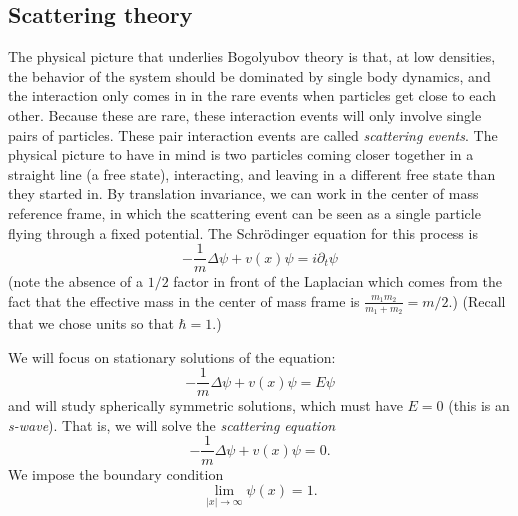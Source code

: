 \documentclass{ian}
\begin{document}
\subsection{Scattering theory}
\indent
The physical picture that underlies Bogolyubov theory is that, at low densities, the behavior of the system should be dominated by single body dynamics, and the interaction only comes in in the rare events when particles get close to each other.
Because these are rare, these interaction events will only involve single pairs of particles.
These pair interaction events are called {\it scattering events}.
The physical picture to have in mind is two particles coming closer together in a straight line (a free state), interacting, and leaving in a different free state than they started in.
By translation invariance, we can work in the center of mass reference frame, in which the scattering event can be seen as a single particle flying through a fixed potential.
The Schr\"odinger equation for this process is
\begin{equation}
  -\frac1m\Delta\psi+v(x)\psi=i\partial_t\psi
\end{equation}
(note the absence of a $1/2$ factor in front of the Laplacian which comes from the fact that the effective mass in the center of mass frame is $\frac{m_1m_2}{m_1+m_2}=m/2$.)
(Recall that we chose units so that $\hbar=1$.)
\bigskip

\indent
We will focus on stationary solutions of the equation:
\begin{equation}
  -\frac1m\Delta\psi+v(x)\psi=E\psi
\end{equation}
and will study spherically symmetric solutions, which must have $E=0$ (this is an {\it s-wave}).
That is, we will solve the {\it scattering equation}
\begin{equation}
  -\frac1m\Delta\psi+v(x)\psi=0
  .
  \label{scateq}
\end{equation}
We impose the boundary condition
\begin{equation}
  \lim_{|x|\to\infty} \psi(x)=1
  .
\end{equation}
\bigskip
\end{document}

